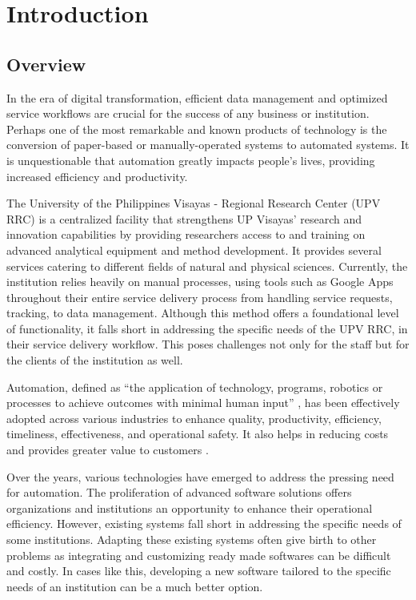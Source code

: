\chapter{Introduction}
\label{sec:researchdesc}    %

\section{Overview}
\label{sec:overview}

In the era of digital transformation, efficient data management and optimized service workflows are crucial for the success of any business or institution. Perhaps one of the most remarkable and known products of technology is the conversion of paper-based or manually-operated systems to automated systems. It is unquestionable that automation greatly impacts people's lives, providing increased efficiency and productivity.

The University of the Philippines Visayas - Regional Research Center (UPV RRC) is a centralized facility that strengthens UP Visayas’ research and innovation capabilities by providing researchers access to and training on advanced analytical equipment and method development. It provides several services catering to different fields of natural and physical sciences. Currently, the institution relies heavily on manual processes, using tools such as Google Apps throughout their entire service delivery process from handling service requests, tracking, to data management. Although this method offers a foundational level of functionality, it falls short in addressing the specific needs of the UPV RRC, in their service delivery workflow. This poses challenges not only for the staff but for the clients of the institution as well. 

Automation, defined as “the application of technology, programs, robotics or processes to achieve outcomes with minimal human input” \cite{ibm}, has been effectively adopted across various industries to enhance quality, productivity, efficiency, timeliness, effectiveness, and operational safety. It also helps in reducing costs and provides greater value to customers \cite{caban2021}. 

Over the years, various technologies have emerged to address the pressing need for automation. The proliferation of advanced software solutions offers organizations and institutions an opportunity to enhance their operational efficiency. However, existing systems fall short in addressing the specific needs of some institutions. Adapting these existing systems often give birth to other problems as integrating and customizing ready made softwares can be difficult and costly. In cases like this, developing a new software tailored to the specific needs of an institution can be a much better option.

